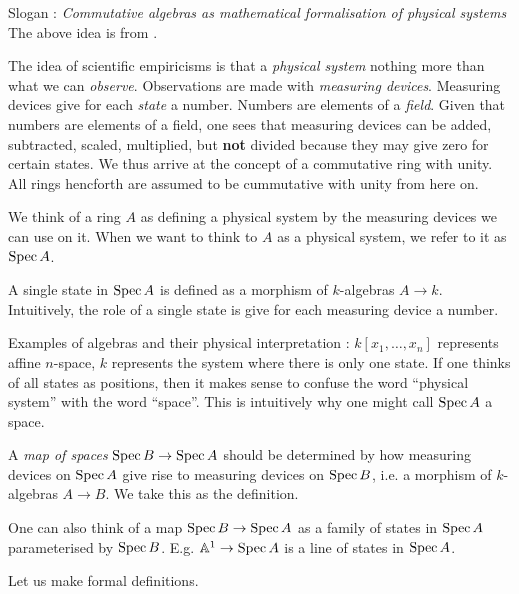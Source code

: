 \documentclass[./main.tex]{subfiles}
\begin{document}
Slogan : 
\emph{
  Commutative algebras as mathematical formalisation of
physical systems
}
The above idea is from \cite{Nes21}.
  
The idea of scientific empiricisms is that 
a \emph{physical system} nothing more than what we
can \emph{observe}. Observations are made with \emph{measuring devices}.
Measuring devices give for each \emph{state} a number.
Numbers are elements of a \emph{field}.
Given that numbers are elements of a field,
one sees that measuring devices can be added, 
subtracted, scaled, multiplied, but \textbf{not} divided
because they may give zero for certain states.
We thus arrive at the concept of a commutative ring with unity.
All rings hencforth are assumed to be cummutative with unity from here on.
  
We think of a ring $A$ as defining
a physical system by the measuring devices we can use on it.
When we want to think to $A$ as a physical system,
we refer to it as $\operatorname{Spec} A$.

A single state in $\operatorname{Spec} A$ is defined as
  a morphism of $k$-algebras $A \to k$.
  Intuitively, the role of a single state is give
  for each measuring device a number.

Examples of algebras and their physical interpretation : 
  $k[x_1 , \dots , x_n]$ represents affine $n$-space,
  $k$ represents the system where there is only one state.
  If one thinks of all states as positions,
  then it makes sense to confuse the word ``physical system''
  with the word ``space''.
  This is intuitively why one might call $\operatorname{Spec} A$ a space.
  
A \emph{map of spaces} $\operatorname{Spec} B \to \operatorname{Spec} A$ 
  should be determined by how measuring devices on $\operatorname{Spec} A$
  give rise to measuring devices on $\operatorname{Spec} B$,
  i.e. a morphism of $k$-algebras $A \to B$.
  We take this as the definition.

One can also think of a map $\operatorname{Spec} B \to \operatorname{Spec} A$
as a family of states in $\operatorname{Spec} A$ parameterised by $\operatorname{Spec} B$.
E.g. $\mathbb{A}^1 \to \operatorname{Spec} A$ is a line of states in $\operatorname{Spec} A$.

Let us make formal definitions.
\end{document}
